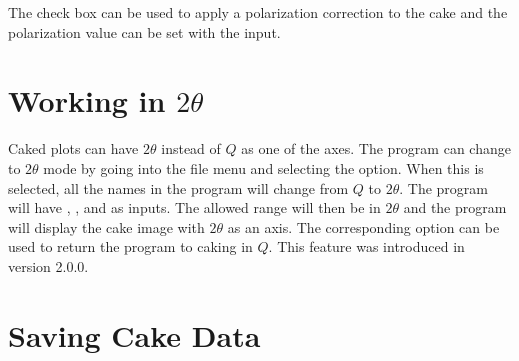 The  check box
can be used to apply a polarization correction to the cake
and the polarization value can be set with the  input.

\section{\texorpdfstring{Working in $2\theta$}{Working in 2theta}}

Caked plots can have $2\theta$ instead of $Q$ as one
of the axes. The program can change 
to $2\theta$ mode by going into the file menu and selecting 
the  option. When this is selected,
all the names in the program will change from $Q$ to $2\theta$. 
The program will have , , 
and  as inputs. The allowed range will
then be in $2\theta$ and the program will display the cake image with
$2\theta$ as an axis. The corresponding  option 
can be used to return the program to caking in $Q$.
This feature was introduced in version 2.0.0.

\section{Saving Cake Data}

